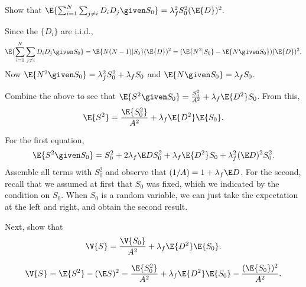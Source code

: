 \begin{exercise}
Show that 
$\E{\sum_{i=1}^N \sum_{j\neq i} D_i D_j\given S_0} = \lambda_f^2 S_0^2 (\E{D})^2.$
\begin{solution}
Since the $\{D_i\}$ are i.i.d., 
  \begin{equation*}
\E{\sum_{i=1}^N \sum_{j\neq i} D_i D_j\given S_0}
= \E{N(N-1)|S_0} (\E{D})^2 
= (\E{N^2|S_0}-\E{N\given S_0}) (\E{D})^2.
  \end{equation*}
Now $\E{N^2\given S_0}=\lambda_f^2 S_0^2 +\lambda_f S_0$ and $\E{N\given S_0} = \lambda_f S_0$.
\end{solution}
\end{exercise}

\begin{exercise}
  Combine the above to see that
    $\E{S^2\given S_0} = \frac{S_0^2}{A^2} + \lambda_f \E{D^2} S_0$. From this, 
  \begin{equation*}
    \E{S^2} = \frac{\E{S_0^2}}{A^2} + \lambda_f \E{D^2} \E{S_0}.
  \end{equation*}
  \begin{solution}
For the first equation,
\begin{equation*}
  \E{S^2\given S_0} = S_0^2 + 2\lambda_f \E D S_0^2 + \lambda_f \E{D^2} S_0 + \lambda_f^2 (\E D)^2 S_0^2.
\end{equation*}
Assemble all terms with $S_0^2$ and observe that $(1/A) = 1+\lambda_f \E D$. For the second, recall that we assumed at first that $S_0$ was fixed, which we indicated by the condition on $S_0$. When $S_0$ is a random variable, we can just take the expectation at the left and right, and obtain the second result. 
  \end{solution}
\end{exercise}

\begin{exercise}
Next, show that  
  \begin{equation*}
    \V{S} = \frac{\V{S_0}}{A^2} + \lambda_f \E{D^2} \E{S_0}.
  \end{equation*}
  \begin{solution}
    \begin{equation*}
    \V{S} = \E{S^2} - (\E S)^2 = 
\frac{\E{S_0^2}}{A^2} + \lambda_f \E{D^2} \E{S_0} -\frac{(\E{S_0})^2}{A^2}.
    \end{equation*}
  \end{solution}
\end{exercise}

